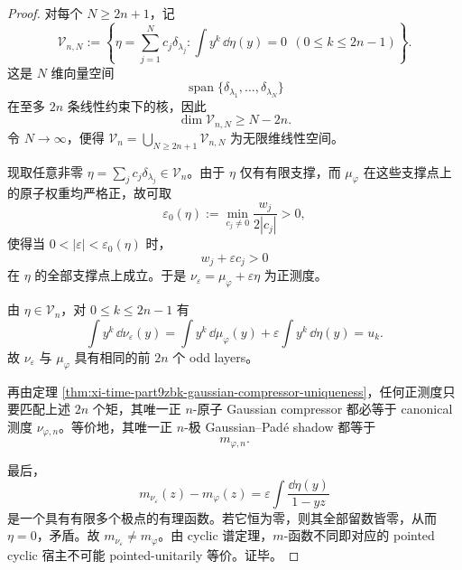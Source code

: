 \begin{proof}
对每个 \(N\ge 2n+1\)，记
\[
\mathcal V_{n,N}
:=
\left\{
\eta=\sum_{j=1}^{N}c_j\delta_{\lambda_j}:
\int y^k\,\dd\eta(y)=0\ \ (0\le k\le 2n-1)
\right\}.
\]
这是 \(N\) 维向量空间
\[
\operatorname{span}\{\delta_{\lambda_1},\dots,\delta_{\lambda_N}\}
\]
在至多 \(2n\) 条线性约束下的核，因此
\[
\dim \mathcal V_{n,N}\ge N-2n.
\]
令 \(N\to\infty\)，便得 \(\mathcal V_n=\bigcup_{N\ge 2n+1}\mathcal V_{n,N}\) 为无限维线性空间。

现取任意非零 \(\eta=\sum_j c_j\delta_{\lambda_j}\in\mathcal V_n\)。由于 \(\eta\) 仅有有限支撑，而 \(\mu_\varphi\) 在这些支撑点上的原子权重均严格正，故可取
\[
\varepsilon_0(\eta)
:=
\min_{c_j\neq 0}\frac{w_j}{2|c_j|}>0,
\]
使得当 \(0<|\varepsilon|<\varepsilon_0(\eta)\) 时，
\[
w_j+\varepsilon c_j>0
\]
在 \(\eta\) 的全部支撑点上成立。于是 \(\nu_\varepsilon=\mu_\varphi+\varepsilon\eta\) 为正测度。

由 \(\eta\in\mathcal V_n\)，对 \(0\le k\le 2n-1\) 有
\[
\int y^k\,\dd\nu_\varepsilon(y)
=
\int y^k\,\dd\mu_\varphi(y)+\varepsilon\int y^k\,\dd\eta(y)
=
u_k.
\]
故 \(\nu_\varepsilon\) 与 \(\mu_\varphi\) 具有相同的前 \(2n\) 个 odd layers。

再由定理 \ref{thm:xi-time-part9zbk-gaussian-compressor-uniqueness}，任何正测度只要匹配上述 \(2n\) 个矩，其唯一正 \(n\)-原子 Gaussian compressor 都必等于 canonical 测度 \(\nu_{\varphi,n}\)。等价地，其唯一正 \(n\)-极 Gaussian--Pad\'e shadow 都等于
\[
m_{\varphi,n}.
\]

最后，
\[
m_{\nu_\varepsilon}(z)-m_\varphi(z)
=
\varepsilon\int\frac{\dd\eta(y)}{1-yz}
\]
是一个具有有限多个极点的有理函数。若它恒为零，则其全部留数皆零，从而 \(\eta=0\)，矛盾。故 \(m_{\nu_\varepsilon}\neq m_\varphi\)。由 cyclic 谱定理，\(m\)-函数不同即对应的 pointed cyclic 宿主不可能 pointed-unitarily 等价。证毕。
\end{proof}

